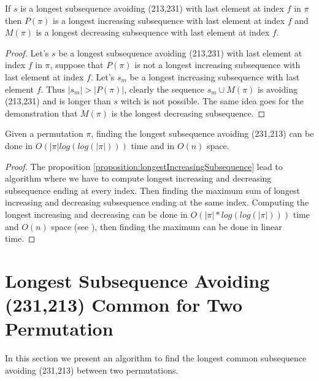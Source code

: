 \documentclass[a4paper]{llncs}
\newcommand{\ptext}{\pi}
\newcounter{num}
\begin{document}
	\begin{proposition}
	\label{proposition:longestIncreasingSubsequence}
	If $s$ is a longest subsequence avoiding (213,231) with last element at index $f$ in $\pi$ then
	$P(\pi)$ is a longest increasing subsequence with last element at index $f$ and
	$M(\pi)$ is a longest decreasing subsequence with last element at index $f$.	
	\end{proposition}
	
	\begin{proof}
	Let's $s$ be a longest subsequence avoiding (213,231) with last element at index $f$ in $\pi$, 
	suppose that $P(\pi)$ is not a longest increasing subsequence with last element at index $f$. Let's $s_m$ be a longest increasing subsequence with last element $f$.
	Thus $|s_m|>|P(\pi)|$, clearly the sequence $s_m \cup M(\pi)$
	is avoiding (213,231) and is longer than $s$ witch is not possible. 
	The same idea goes for the demonstration that $M(\pi)$ is the longest decreasing subsequence.
	\end{proof}

	\begin{proposition}
	Given a permutation $\pi$, 
	finding the longest subsequence avoiding (231,213)
	can be done in $O(|\ptext|log(log(|\ptext|)))$ time and in $O(n)$ space.	
	\end{proposition}
	
	\begin{proof}
	The proposition \ref{proposition:longestIncreasingSubsequence} lead to algorithm 
	where we have to compute longest increasing and decreasing subsequence ending at every index. Then finding the maximum sum of longest increasing and decreasing subsequence ending at the same index.
	Computing the longest increasing and decreasing can be done in $O(|\ptext|*log(log(|\ptext|)))$ time and $O(n)$ space (see \cite{Bespamyatnikh00enumeratinglongest}), then finding the maximum can be done in linear time.
	\end{proof}


\section{Longest Subsequence Avoiding \\(231,213) Common for Two Permutation}

In this section we present an algorithm to find 
the longest common subsequence avoiding (231,213) 
between two permutations.\\
\end{document}
